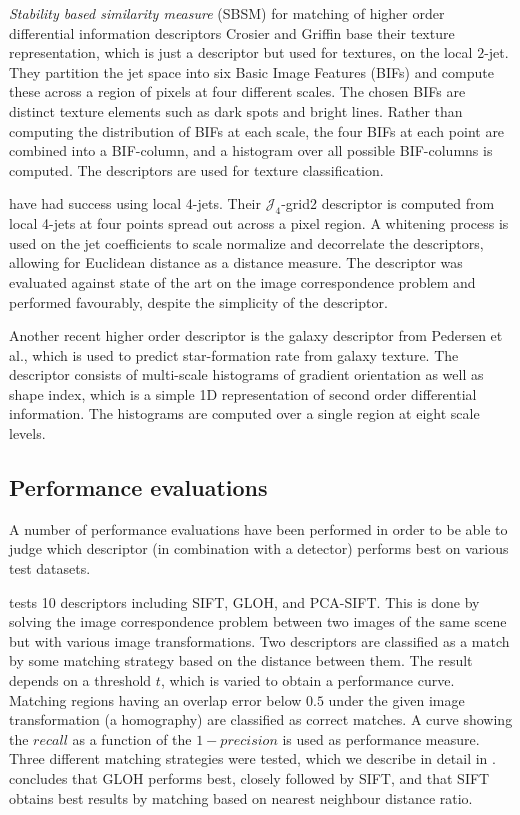 \documentclass[../thesis.tex]{subfiles}
\begin{document}
\emph{Stability based similarity measure} (SBSM) \cite{balmashnova2008novel} for matching of higher order differential information descriptors Crosier and Griffin \cite{crosier2010using} base their texture representation, which is just a descriptor but used for textures, on the local $2$-jet. They partition the jet space into six Basic Image Features (BIFs) and compute these across a region of pixels at four different scales. The chosen BIFs are distinct texture elements such as dark spots and bright lines. Rather than computing the distribution of BIFs at each scale, the four BIFs at each point are combined into a BIF-column, and a histogram over all possible BIF-columns is computed. The descriptors are used for texture classification.

\cite{larsen2012jet} have had success using local 4-jets. Their $\mathcal{J}_4$-grid2 descriptor is computed from local 4-jets at four points spread out across a pixel region. A whitening process is used on the jet coefficients to scale normalize and decorrelate the descriptors, allowing for Euclidean distance as a distance measure. The descriptor was evaluated against state of the art on the image correspondence problem and performed favourably, despite the simplicity of the descriptor.

Another recent higher order descriptor is the galaxy descriptor from Pedersen et al.\cite{pedersen2013shape}, which is used to predict star-formation rate from galaxy texture. The descriptor consists of multi-scale histograms of gradient orientation as well as shape index, which is a simple 1D representation of second order differential information. The histograms are computed over a single region at eight scale levels.

\subsection{Performance evaluations}
A number of performance evaluations have been performed in order to be able to judge which descriptor (in combination with a detector) performs best on various test datasets.

\cite{mikolajczyk2005performance} tests 10 descriptors including SIFT, GLOH, and PCA-SIFT. This is done by solving the image correspondence problem between two images of the same scene but with various image transformations. Two descriptors are classified as a match by some matching strategy based on the distance between them. The result depends on a threshold $t$, which is varied to obtain a performance curve. Matching regions having an overlap error below $0.5$ under the given image transformation (a homography) are classified as correct matches. A curve showing the $recall$ as a function of the $1-precision$ is used as performance measure. Three different matching strategies were tested, which we describe in detail in . \cite{mikolajczyk2005performance} concludes that GLOH performs best, closely followed by SIFT, and that SIFT obtains best results by matching based on nearest neighbour distance ratio.
\end{document}
